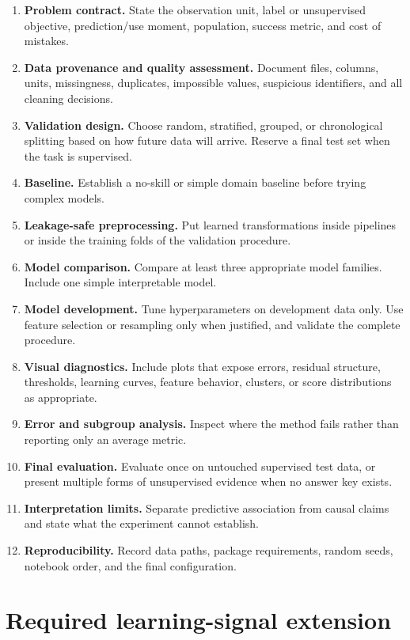 \begin{enumerate}
  \item \textbf{Problem contract.} State the observation unit, label or unsupervised objective, prediction/use moment, population, success metric, and cost of mistakes.
  \item \textbf{Data provenance and quality assessment.} Document files, columns, units, missingness, duplicates, impossible values, suspicious identifiers, and all cleaning decisions.
  \item \textbf{Validation design.} Choose random, stratified, grouped, or chronological splitting based on how future data will arrive. Reserve a final test set when the task is supervised.
  \item \textbf{Baseline.} Establish a no-skill or simple domain baseline before trying complex models.
  \item \textbf{Leakage-safe preprocessing.} Put learned transformations inside pipelines or inside the training folds of the validation procedure.
  \item \textbf{Model comparison.} Compare at least three appropriate model families. Include one simple interpretable model.
  \item \textbf{Model development.} Tune hyperparameters on development data only. Use feature selection or resampling only when justified, and validate the complete procedure.
  \item \textbf{Visual diagnostics.} Include plots that expose errors, residual structure, thresholds, learning curves, feature behavior, clusters, or score distributions as appropriate.
  \item \textbf{Error and subgroup analysis.} Inspect where the method fails rather than reporting only an average metric.
  \item \textbf{Final evaluation.} Evaluate once on untouched supervised test data, or present multiple forms of unsupervised evidence when no answer key exists.
  \item \textbf{Interpretation limits.} Separate predictive association from causal claims and state what the experiment cannot establish.
  \item \textbf{Reproducibility.} Record data paths, package requirements, random seeds, notebook order, and the final configuration.
\end{enumerate}

\section*{Required learning-signal extension}

